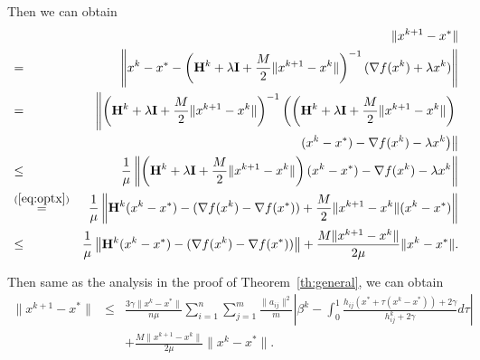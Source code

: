\documentclass[12pt]{article}
\newcommand{\newalpha}{h}
\newcommand{\mH}{\mathbf{H}}
\newcommand{\mI}{\mathbf{I}}
\begin{document}
\noindent Then we can obtain 
\begin{eqnarray*}
	&&\|x^{k+1} - x^*\|\\
	&=& \left \| x^k - x^* - \left(\mH^k + \lambda \mI +  \frac{M}{2}\|x^{k+1} - x^k\| \right)^{-1} (\nabla f(x^k) + \lambda x^k) \right\| \\
	&=& \left\| \left(\mH^k + \lambda \mI + \frac{M}{2}\|x^{k+1} - x^k\| \right)^{-1}\left(  \left( \mH^k + \lambda \mI + \frac{M}{2}\|x^{k+1} - x^k\| \right)\right.\right.\\
	&&\qquad\qquad\qquad\qquad \left.\left.(x^k - x^*) - \nabla f(x^k) - \lambda x^k  \right) \right\| \\ 
	&\leq& \frac{1}{\mu}  \left\|  \left(\mH^k + \lambda \mI +  \frac{M}{2}\|x^{k+1} - x^k\| \right)(x^k - x^*) - \nabla f(x^k) - \lambda x^k  \right \| \\ 
	&\overset{(\ref{eq:optx})}{=}& \frac{1}{\mu} \left\| \mH^k (x^k - x^*) - (\nabla f(x^k) - \nabla f(x^*)) +  \frac{M}{2}\|x^{k+1} - x^k\|(x^k - x^*) \right\| \\ 
	&\leq& \frac{1}{\mu} \left\| \mH^k (x^k - x^*) - (\nabla f(x^k) - \nabla f(x^*)) \right\|  + \frac{M\|x^{k+1} - x^k\|}{2\mu} \| x^k - x^* \|. 
\end{eqnarray*}

\noindent Then same as the analysis in the proof of Theorem~\ref{th:general}, we can obtain 
\begin{eqnarray*}
	\|x^{k+1} - x^*\| &\leq& \frac{3\gamma\|x^k - x^*\|}{n \mu} \sum_{i=1}^n \sum_{j=1}^{m} \frac{\|a_{ij}\|^2}{m} \left|   \beta^k - \int_{0}^1 \frac{\newalpha_{ij}(x^* + \tau(x^k - x^*)) + 2\gamma}{ h_{ij}^k + 2\gamma} d\tau   \right| \\ 
	&& +  \frac{M\|x^{k+1} - x^k\|}{2\mu} \| x^k - x^* \|.
\end{eqnarray*}
\end{document}
